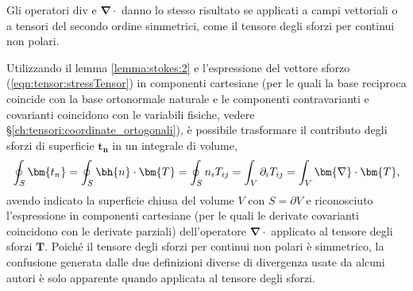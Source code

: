 \begin{remark}
 Gli operatori $\text{div}$  e $\bm{\nabla} \cdot$ danno lo stesso risultato se applicati a campi vettoriali o a tensori del secondo ordine simmetrici, come il tensore degli sforzi per continui non polari.
\end{remark}

\begin{remark}
Utilizzando il lemma \ref{lemma:stokes:2} e l'espressione del vettore sforzo (\ref{eqn:tensor:stressTensor}) in componenti cartesiane (per le quali la base reciproca coincide con la base ortonormale naturale e le componenti contravarianti e covarianti coincidono con le variabili fisiche, vedere \S\ref{ch:tensori:coordinate_ortogonali}), è possibile trasformare il contributo degli sforzi di superficie $\bm{t_n}$ in un integrale di volume,
\begin{equation}
  \oint_S \bm{t_n} = \oint_S \bh{n} \cdot \bm{T} = \oint_S n_i T_{ij} = \int_V \partial_i T_{ij} = \int_V \bm{\nabla} \cdot \bm{T} ,
\end{equation}
 avendo indicato la superficie chiusa del volume $V$ con $S=\partial V$ e riconosciuto l'espressione in componenti cartesiane (per le quali le derivate covarianti coincidono con le derivate parziali) dell'operatore $\bm{\nabla} \cdot$ applicato al tensore degli sforzi $\bm{T}$. Poiché il tensore degli sforzi per continui non polari è simmetrico, la confusione generata dalle due definizioni diverse di divergenza usate da alcuni autori è solo apparente quando applicata al tensore degli sforzi.
\end{remark}


